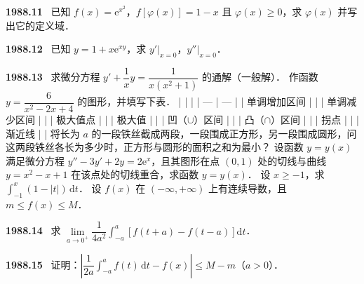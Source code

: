 \documentclass[UTF8,12pt]{ctexart}
\newcommand{\qn}[1]{\textbf{\large #1}\ }
\begin{document}
\vfill
\newpage
\qn{1988.11}
已知 $f(x)=\mathrm{e}^{x^2}$，$f[\varphi(x)]=1-x$ 且 $\varphi(x)\geqslant0$，求 $\varphi(x)$ 并写出它的定义域．

\vfill
\newpage
\qn{1988.12}
已知 $y=1+x\mathrm{e}^{xy}$，求 $\left.y'\right|_{x=0}$，$\left.y''\right|_{x=0}$．

\vfill
\newpage
\qn{1988.13}
求微分方程 $y'+\dfrac{1}{x}y=\dfrac{1}{x(x^2+1)}$ 的通解（一般解）．
作函数 $y=\dfrac{6}{x^2-2x+4}$ 的图形，并填写下表．
|  |  |
| --- | --- |
| 单调增加区间 |  |
| 单调减少区间 |  |
| 极大值点 |  |
| 极大值 |  |
| 凹（$\cup$）区间 |  |
| 凸（$\cap$）区间 |  |
| 拐点 |  |
| 渐近线 |  |
将长为 $a$ 的一段铁丝截成两段，一段围成正方形，另一段围成圆形，问这两段铁丝各长为多少时，正方形与圆形的面积之和为最小？
设函数 $y=y(x)$ 满足微分方程 $y''-3y'+2y=2\mathrm{e}^x$，且其图形在点 $(0,1)$ 处的切线与曲线 $y=x^2-x+1$ 在该点处的切线重合，求函数 $y=y(x)$．
设 $x\geqslant-1$，求 $\int_{-1}^x(1-|t|)\,\mathrm{d}t$．
设 $f(x)$ 在 $(-\infty,+\infty)$ 上有连续导数，且 $m\leqslant f(x)\leqslant M$．

\vfill
\newpage
\qn{1988.14}
求 $\lim\limits_{a\to0^+}\dfrac{1}{4a^2}\int_{-a}^a\left[f(t+a)-f(t-a)\right]\mathrm{d}t$．

\vfill
\newpage
\qn{1988.15}
证明：$\left|\dfrac{1}{2a}\int_{-a}^a f(t)\,\mathrm{d}t-f(x)\right|\leqslant M-m$（$a>0$）．

\vfill
\newpage
\end{document}
